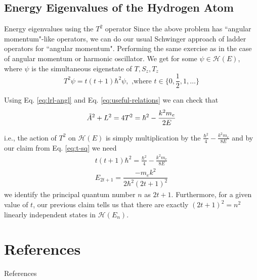\documentclass{beamer}
\begin{document}
\subsection{Energy Eigenvalues of the Hydrogen Atom}
\begin{frame}{Energy eigenvalues using the $T^2$  operator}
Since the above problem has ``angular momentum"-like operators, we can do our usual Schwinger approach of ladder operators for ``angular momentum". Performing the same exercise as in the case of angular momentum or harmonic oscillator. We get for some $\psi \in \mathcal{H}(E)$, where $\psi$ is the simultaneous eigenstate of $T, S_z, T_z$
    \begin{equation}
        \label{eq:t-sq}
        T^2  \psi = t (t+1) \hbar^2 \psi, \text{  ,where }t \in \{ 0, \frac{1}{2}, 1, \hdots\}
    \end{equation}
    
    Using Eq. \ref{eq:lrl-angl} and Eq. \ref{eq:useful-relations} we can check that
    \begin{equation}
        \Tilde{A}^2 + L^2 = 4T^2 = \hbar^2 - \frac{k^2 m_e}{2E}
    \end{equation}
\end{frame}
\begin{frame}{}
    i.e., the action of $T^2$ on $\mathcal{H}(E)$ is simply multiplication by the $\frac{\hbar^2}{4} - \frac{k^2 m_e}{8E}$ and by our claim from Eq. \ref{eq:t-sq} we need
    \begin{equation}
        \begin{gathered}
            t(t+1) \hbar^2 = \frac{\hbar^2}{4} - \frac{k^2 m_e}{8E}\\
            \boxed{E_{2t +1} = \dfrac{-m_e k^2}{2 \hbar^2 (2t +1)^2}}
        \end{gathered}
    \end{equation}
    we identify the principal quantum number $n$ as $2t+1$. Furthermore, for a given value of $t$, our previous claim tells us that there are exactly $(2t +1)^2 = n^2$  linearly independent states in $\mathcal{H}(E_n)$. \nocite{*}
\end{frame}
\section{References}
\begin{frame}{References}

\printbibliography

\end{frame}

\end{document}
